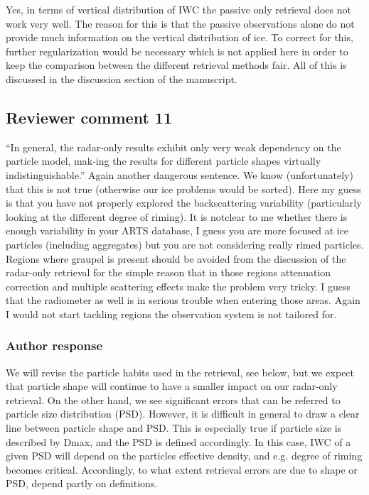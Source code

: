 \documentclass[11pt]{scrartcl}
\begin{document}
Yes, in terms of vertical distribution of IWC the passive only retrieval does
not work very well. The reason for this is that the passive observations alone
do not provide much information on the vertical distribution of ice. To correct
for this, further regularization would be necessary which is not applied here in
order to keep the comparison between the different retrieval methods fair. All
of this is discussed in the discussion section of the manuscript.

\subsection*{Reviewer comment 11}

“In general, the radar-only results exhibit only very weak dependency on the
particle model, mak-ing the results for different particle shapes virtually
indistinguishable.” Again another dangerous sentence. We know (unfortunately)
that this is not true (otherwise our ice problems would be sorted). Here my guess
is that you have not properly explored the backscattering variability
(particularly looking at the different degree of riming). It is notclear to me
whether there is enough variability in your ARTS database, I guess you are more
focused at ice particles (including aggregates) but you are not considering
really rimed particles. Regions where graupel is present should be avoided from
the discussion of the radar-only retrieval for the simple reason that in those
regions attenuation correction and multiple scattering effects make the problem
very tricky. I guess that the radiometer as well is in serious trouble when
entering those areas. Again I would not start tackling regions the observation
system is not tailored for.

\subsubsection*{Author response}

We will revise the particle habits used in the retrieval, see below, but we
expect that particle shape will continue to have a smaller impact on our
radar-only retrieval. On the other hand, we see significant errors that can be
referred to particle size distribution (PSD). However, it is difficult in
general to draw a clear line between particle shape and PSD. This is especially
true if particle size is described by Dmax, and the PSD is defined accordingly.
In this case, IWC of a given PSD will depend on the particles effective density,
and e.g. degree of riming becomes critical. Accordingly, to what extent
retrieval errors are due to shape or PSD, depend partly on definitions.
\end{document}
